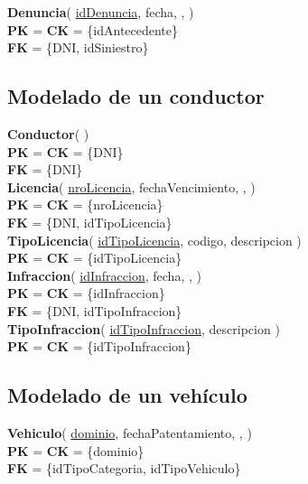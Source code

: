 \textbf{Denuncia}(
    \uline{idDenuncia},
    fecha,
    ,
)\\
\textbf{PK} = \textbf{CK} = \{idAntecedente\}\\
\textbf{FK} = \{DNI, idSiniestro\}\\


\subsection{Modelado de un conductor}

\textbf{Conductor}(
)\\
\textbf{PK} = \textbf{CK} = \{DNI\}\\
\textbf{FK} = \{DNI\}\\

\textbf{Licencia}(
    \uline{nroLicencia},
    fechaVencimiento,
    ,
)\\
\textbf{PK} = \textbf{CK} = \{nroLicencia\}\\
\textbf{FK} = \{DNI, idTipoLicencia\}\\

\textbf{TipoLicencia}(
    \uline{idTipoLicencia},
    codigo,
    descripcion
)\\
\textbf{PK} = \textbf{CK} = \{idTipoLicencia\}\\

\textbf{Infraccion}(
    \uline{idInfraccion},
    fecha,
    ,
)\\
\textbf{PK} = \textbf{CK} = \{idInfraccion\}\\
\textbf{FK} = \{DNI, idTipoInfraccion\}\\

\textbf{TipoInfraccion}(
    \uline{idTipoInfraccion},
    descripcion
)\\
\textbf{PK} = \textbf{CK} = \{idTipoInfraccion\}\\

\subsection{Modelado de un vehículo}

\textbf{Vehiculo}(
    \uline{dominio},
    fechaPatentamiento,
    ,
)\\
\textbf{PK} = \textbf{CK} = \{dominio\}\\
\textbf{FK} = \{idTipoCategoria, idTipoVehiculo\}\\

